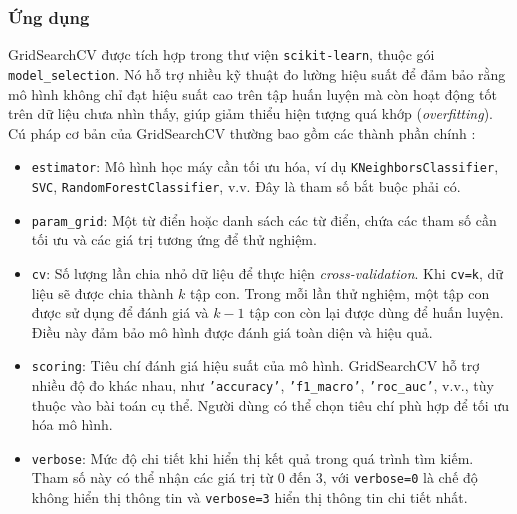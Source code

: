\documentclass[a4paper,12pt]{article}
\begin{document}
\subsubsection{Ứng dụng} 
\hspace{5mm}GridSearchCV được tích hợp trong thư viện \texttt{scikit-learn}, thuộc gói \newline \texttt{model\_selection}. Nó hỗ trợ nhiều kỹ thuật đo lường hiệu suất để đảm bảo rằng mô hình không chỉ đạt hiệu suất cao trên tập huấn luyện mà còn hoạt động tốt trên dữ liệu chưa nhìn thấy, giúp giảm thiểu hiện tượng quá khớp (\textit{overfitting}).\\

\noindent Cú pháp cơ bản của GridSearchCV thường bao gồm các thành phần chính \cite{gridsearchcv_mygreatlearning}:
\begin{itemize}
    \item \texttt{estimator}: Mô hình học máy cần tối ưu hóa, ví dụ \texttt{KNeighborsClassifier}, \\
    \texttt{SVC}, \texttt{RandomForestClassifier}, v.v. Đây là tham số bắt buộc phải có.
    \item \texttt{param\_grid}: Một từ điển hoặc danh sách các từ điển, chứa các tham số cần tối ưu và các giá trị tương ứng để thử nghiệm.
    \item \texttt{cv}: Số lượng lần chia nhỏ dữ liệu để thực hiện \textit{cross-validation}. Khi \texttt{cv=k}, dữ liệu sẽ được chia thành \(k\) tập con. Trong mỗi lần thử nghiệm, một tập con được sử dụng để đánh giá và \(k-1\) tập con còn lại được dùng để huấn luyện. Điều này đảm bảo mô hình được đánh giá toàn diện và hiệu quả.
    \item \texttt{scoring}: Tiêu chí đánh giá hiệu suất của mô hình. GridSearchCV hỗ trợ nhiều độ đo khác nhau, như \texttt{'accuracy'}, \texttt{'f1\_macro'}, \texttt{'roc\_auc'}, v.v., tùy thuộc vào bài toán cụ thể. Người dùng có thể chọn tiêu chí phù hợp để tối ưu hóa mô hình.
    \item \texttt{verbose}: Mức độ chi tiết khi hiển thị kết quả trong quá trình tìm kiếm. Tham số này có thể nhận các giá trị từ 0 đến 3, với \texttt{verbose=0} là chế độ không hiển thị thông tin và \texttt{verbose=3} hiển thị thông tin chi tiết nhất.
\end{itemize}
\end{document}
